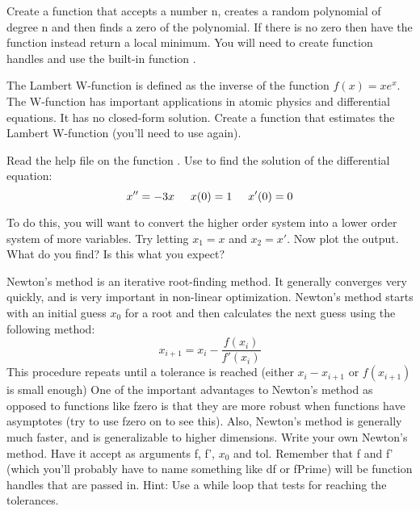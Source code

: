 \begin{problem}
Create a function that accepts a number n, creates a random polynomial of degree n and then finds a zero of the polynomial. If there is no zero then have the function instead return a local minimum. You will need to create function handles and use the built-in function .
\end{problem}

\begin{problem}
The Lambert W-function is defined as the inverse of the function $f(x) = xe^x$. The W-function has important applications in atomic physics and differential equations. It has no closed-form solution. Create a function that estimates the Lambert W-function (you'll need to use  again).
\end{problem}

\begin{problem}
	Read the help file on the function . Use  to find the solution of the differential equation:
	\[
		x'' = -3x \hspace{5 mm} x(0) = 1 \hspace{5mm} x'(0) = 0
	\]
	
	To do this, you will want to convert the higher order system into a lower order system of more variables. Try letting $x_1 = x$ and $x_2 = x'$.
	Now plot the output. What do you find? Is this what you expect?
\end{problem}

\begin{problem}
Newton's method is an iterative root-finding method. It generally converges very quickly, and is very important in non-linear optimization. Newton's method starts with an initial guess $x_0$ for a root and then calculates the next guess using the following method:
\[
x_{i+1} = x_i - \frac{f(x_i)}{f'(x_i)}
\]
This procedure repeats until a tolerance is reached (either $x_i - x_{i+1}$ or $f(x_{i+1})$ is small enough)
One of the important advantages to Newton's method as opposed to functions like fzero is that they are more robust when functions have asymptotes (try to use fzero on  to see this). Also, Newton's method is generally much faster, and is generalizable to higher dimensions.
Write your own Newton's method. Have it accept as arguments f, f', $x_0$ and tol. Remember that f and f' (which you'll probably have to name something like df or fPrime) will be function handles that are passed in. Hint: Use a while loop that tests for reaching the tolerances.
\end{problem}
